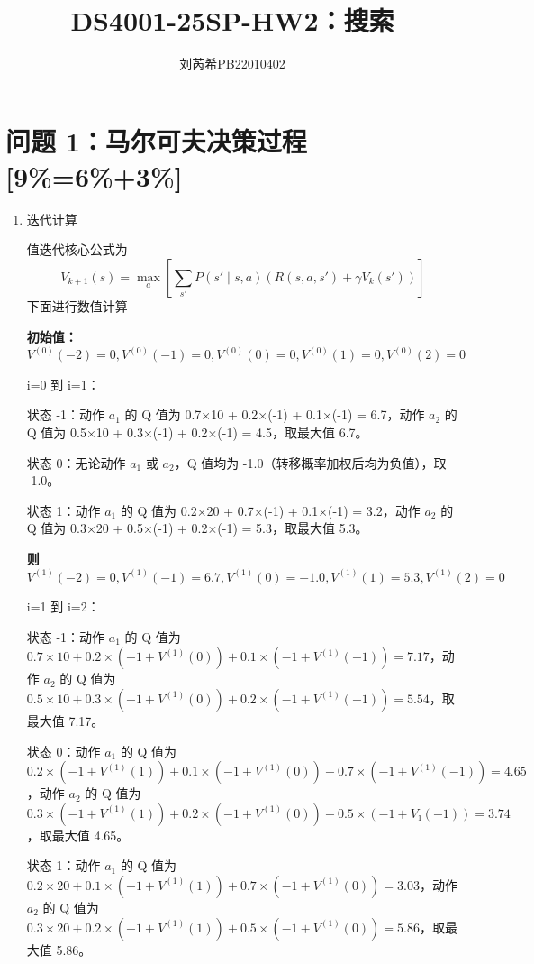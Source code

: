 \documentclass{article}
\title{\bfseries DS4001-25SP-HW2：搜索}
\author{刘芮希\quad PB22010402}
\begin{document}
\maketitle


\section{问题 1：马尔可夫决策过程[9\%=6\%+3\%]}

\begin{enumerate}[label=(\alph*), start=1]
    
    \item 迭代计算
    
    值迭代核心公式为$$V_{k+1}(s) = \max_{a} \left[ \sum_{s'} P(s' \mid s,a) \left( R(s,a,s') + \gamma V_k(s') \right) \right]$$
    下面进行数值计算
    
    \textbf{初始值：}$V^{(0)}(-2) = 0,
    V^{(0)}(-1) = 0,
    V^{(0)}(0) = 0,
    V^{(0)}(1) = 0,
    V^{(0)}(2) = 0$
    
    
    i=0 到 i=1：
    
    状态 -1：动作 $a_1$ 的 Q 值为 0.7×10 + 0.2×(-1) + 0.1×(-1) = 6.7，动作 $a_2$ 的 Q 值为 0.5×10 + 0.3×(-1) + 0.2×(-1) = 4.5，取最大值 6.7。
    
    状态 0：无论动作 $a_1$ 或 $a_2$，Q 值均为 -1.0（转移概率加权后均为负值），取 -1.0。
    
    状态 1：动作 $a_1$ 的 Q 值为 0.2×20 + 0.7×(-1) + 0.1×(-1) = 3.2，动作 $a_2$ 的 Q 值为 0.3×20 + 0.5×(-1) + 0.2×(-1) = 5.3，取最大值 5.3。
    
    \textbf{则}$V^{(1)}(-2) = 0,
    V^{(1)}(-1) = 6.7,
    V^{(1)}(0) = -1.0,
    V^{(1)}(1) = 5.3,
    V^{(1)}(2) = 0$
    
    i=1 到 i=2：
    
    状态 -1：动作 $a_1$ 的 Q 值为 $0.7×10 + 0.2×(-1 + V^{(1)}(0)) + 0.1×(-1 + V^{(1)}(-1)) = 7.17$，动作  $a_2$ 的 Q 值为 $0.5×10 + 0.3×(-1 + V^{(1)}(0)) + 0.2×(-1 + V^{(1)}(-1)) = 5.54$，取最大值 7.17。
    
    状态 0：动作 $a_1$ 的 Q 值为 $0.2×(-1 + V^{(1)}(1)) + 0.1×(-1 + V^{(1)}(0)) + 0.7×(-1 + V^{(1)}(-1)) = 4.65$，动作 $a_2$ 的 Q 值为 $0.3×(-1 + V^{(1)}(1)) + 0.2×(-1 + V^{(1)}(0)) + 0.5×(-1 + V₁(-1)) = 3.74$，取最大值 4.65。
    
    状态 1：动作 $a_1$ 的 Q 值为 $0.2×20 + 0.1×(-1 + V^{(1)}(1)) + 0.7×(-1 + V^{(1)}(0)) = 3.03$，动作 $a_2$ 的 Q 值为 $0.3×20 + 0.2×(-1 + V^{(1)}(1)) + 0.5×(-1 + V^{(1)}(0)) = 5.86$，取最大值 5.86。
    

\end{enumerate}
\end{document}

